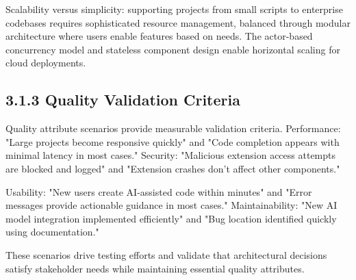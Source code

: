Scalability versus simplicity: supporting projects from small scripts to enterprise codebases requires sophisticated resource management, balanced through modular architecture where users enable features based on needs. The actor-based concurrency model and stateless component design enable horizontal scaling for cloud deployments.

\subsection*{3.1.3 Quality Validation Criteria}

Quality attribute scenarios provide measurable validation criteria. Performance: "Large projects become responsive quickly" and "Code completion appears with minimal latency in most cases." Security: "Malicious extension access attempts are blocked and logged" and "Extension crashes don't affect other components."

Usability: "New users create AI-assisted code within minutes" and "Error messages provide actionable guidance in most cases." Maintainability: "New AI model integration implemented efficiently" and "Bug location identified quickly using documentation."

These scenarios drive testing efforts and validate that architectural decisions satisfy stakeholder needs while maintaining essential quality attributes.


